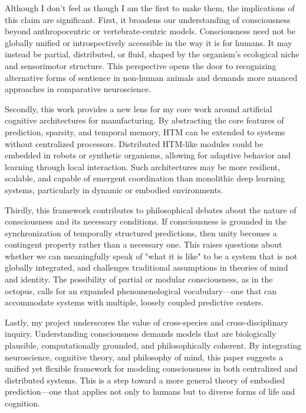 \documentclass{article}
\begin{document}
Although I don't feel as though I am the first to make them, the implications of this claim are significant. First, it broadens our understanding of consciousness beyond anthropocentric or vertebrate-centric models. Consciousness need not be globally unified or introspectively accessible in the way it is for humans. It may instead be partial, distributed, or fluid, shaped by the organism's ecological niche and sensorimotor structure. This perspective opens the door to recognizing alternative forms of sentience in non-human animals and demands more nuanced approaches in comparative neuroscience.

Secondly, this work provides a new lens for my core work around artificial cognitive architectures for manufacturing. By abstracting the core features of prediction, sparsity, and temporal memory, HTM can be extended to systems without centralized processors. Distributed HTM-like modules could be embedded in robots or synthetic organisms, allowing for adaptive behavior and learning through local interaction. Such architectures may be more resilient, scalable, and capable of emergent coordination than monolithic deep learning systems, particularly in dynamic or embodied environments.

Thirdly, this framework contributes to philosophical debates about the nature of consciousness and its necessary conditions. If consciousness is grounded in the synchronization of temporally structured predictions, then unity becomes a contingent property rather than a necessary one. This raises questions about whether we can meaningfully speak of "what it is like" to be a system that is not globally integrated, and challenges traditional assumptions in theories of mind and identity. The possibility of partial or modular consciousness, as in the octopus, calls for an expanded phenomenological vocabulary—one that can accommodate systems with multiple, loosely coupled predictive centers.

Lastly, my project underscores the value of cross-species and cross-disciplinary inquiry. Understanding consciousness demands models that are biologically plausible, computationally grounded, and philosophically coherent. By integrating neuroscience, cognitive theory, and philosophy of mind, this paper suggests a unified yet flexible framework for modeling consciousness in both centralized and distributed systems. This is a step toward a more general theory of embodied prediction—one that applies not only to humans but to diverse forms of life and cognition.
\newpage
\printbibliography
\end{document}
